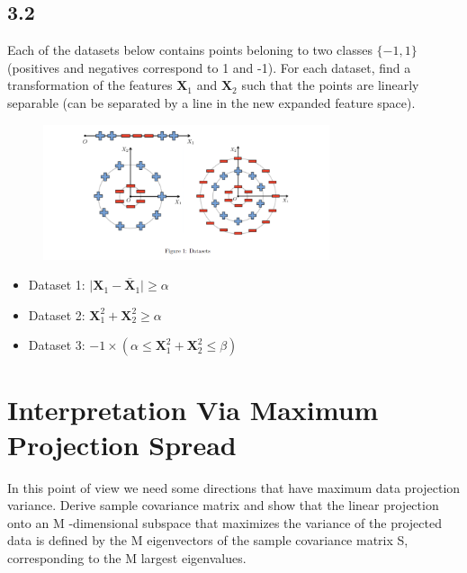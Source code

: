 \documentclass[12pt]{article}
\begin{document}
\subsection{3.2}
Each of the datasets below contains points beloning to two classes $\{-1, 1\}$(positives and negatives correspond to 1 and -1). For each dataset, find a transformation of the features $\mathbf{X}_1$ and $\mathbf{X}_2$
such that the points are linearly separable (can be separated by a line in the new expanded
feature space).
\begin{figure}[h]
    \centering
    \includegraphics[width=0.75\textwidth]{Q3.png}
\end{figure}

\begin{qsolve}
    \begin{itemize}
        \item Dataset 1: $\lvert \mathbf{X}_1 - \bar{\mathbf{X}}_1 \rvert \geq \alpha$
        \item Dataset 2: $\mathbf{X}_1^2 + \mathbf{X}_2^2 \geq \alpha$
        \item Dataset 3: $-1 \times (\alpha \leq \mathbf{X}_1^2 + \mathbf{X}_2^2 \leq \beta)$
    \end{itemize}
\end{qsolve}

\section{Interpretation Via Maximum Projection Spread}
In this point of view we need some directions that have maximum data projection variance.
Derive sample covariance matrix and show that the linear projection onto an M -dimensional
subspace that maximizes the variance of the projected data is defined by the M eigenvectors of
the sample covariance matrix S, corresponding to the M largest eigenvalues.
\end{document}
